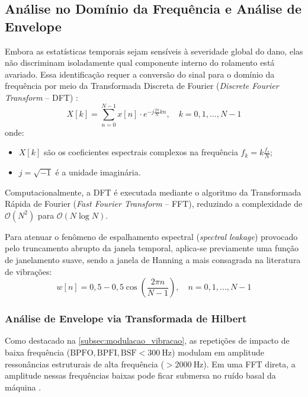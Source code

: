 \subsection{Análise no Domínio da Frequência e Análise de Envelope}
\label{subsec:analise_frequencia}

Embora as estatísticas temporais sejam sensíveis à severidade global do dano, elas não discriminam isoladamente qual componente interno do rolamento está avariado. Essa identificação requer a conversão do sinal para o domínio da frequência por meio da Transformada Discreta de Fourier (\textit{Discrete Fourier Transform} -- DFT) \cite{oppenheim2010discrete}:
\begin{equation}
    X[k] = \sum_{n=0}^{N-1} x[n] \cdot e^{-j \frac{2\pi}{N} k n}, \quad k = 0, 1, \dots, N-1
    \label{eq:dft}
\end{equation}
onde:
\begin{itemize}
    \item $X[k]$ são os coeficientes espectrais complexos na frequência $f_k = k \frac{f_s}{N}$;
    \item $j = \sqrt{-1}$ é a unidade imaginária.
\end{itemize}

Computacionalmente, a DFT é executada mediante o algoritmo da Transformada Rápida de Fourier (\textit{Fast Fourier Transform} -- FFT), reduzindo a complexidade de $\mathcal{O}(N^2)$ para $\mathcal{O}(N \log N)$. 

Para atenuar o fenômeno de espalhamento espectral (\textit{spectral leakage}) provocado pelo truncamento abrupto da janela temporal, aplica-se previamente uma função de janelamento suave, sendo a janela de Hanning a mais consagrada na literatura de vibrações:
\begin{equation}
    w[n] = 0,5 - 0,5 \cos\left( \frac{2\pi n}{N-1} \right), \quad n = 0, 1, \dots, N-1
    \label{eq:hanning}
\end{equation}

\subsubsection{Análise de Envelope via Transformada de Hilbert}
Como destacado na \autoref{subsec:modulacao_vibracao}, as repetições de impacto de baixa frequência ($\text{BPFO}, \text{BPFI}, \text{BSF} < \SI{300}{\hertz}$) modulam em amplitude ressonâncias estruturais de alta frequência ($> \SI{2000}{\hertz}$). Em uma FFT direta, a amplitude nessas frequências baixas pode ficar submersa no ruído basal da máquina \cite{randall2011rolling}.

